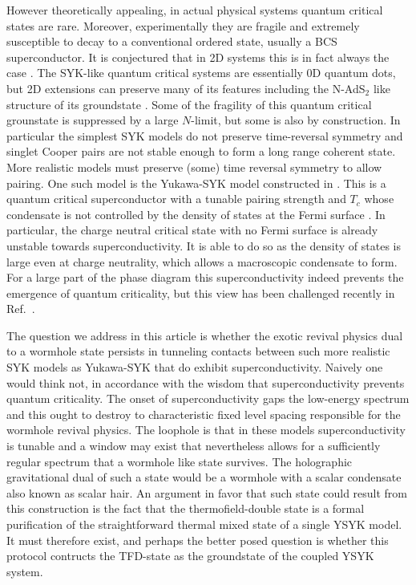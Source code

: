 However theoretically appealing, in actual physical systems quantum critical states are rare. Moreover, experimentally they are fragile and extremely susceptible to decay to a conventional ordered state, usually a BCS superconductor. It is conjectured that in 2D systems this is in fact always the case \cite{metlitskiAreNonFermiliquidsStable2015,abanov2020interplay,chubukov2020interplay}.
The SYK-like quantum critical systems are essentially 0D quantum dots, but 2D extensions can preserve many of its features including the N-AdS$_2$ like structure of its groundstate \cite{patel2023universal}. Some of the fragility of this quantum critical grounstate is suppressed by a large $N$-limit, but some is also by construction. In particular the simplest SYK models do not preserve time-reversal symmetry and singlet Cooper pairs are not stable enough to form a long range coherent state. More realistic models must preserve (some) time reversal symmetry to allow pairing. One such model is the Yukawa-SYK model constructed in \cite{esterlis2019cooper}. This is a quantum critical superconductor with a tunable pairing strength and $T_c$ whose condensate is not controlled by the density of states at the Fermi surface \cite{sheBCSSuperconductivityQuantum2010,esterlis2019cooper}. 
In particular, the charge neutral critical state with no Fermi surface is already unstable towards superconductivity. It is able to do so as the density of states is large even at charge neutrality, which allows a macroscopic condensate to form.
For a large part of the phase diagram this superconductivity indeed prevents the emergence of quantum criticality, but this view has been challenged recently in Ref.~\cite{zhang2023density}.


The question we address in this article is whether the exotic revival physics dual to a wormhole state persists in tunneling contacts between such more realistic SYK models as Yukawa-SYK that do exhibit superconductivity. Naively one would think not, in accordance with the wisdom that superconductivity prevents quantum criticality. The onset of superconductivity gaps the low-energy spectrum and this ought to destroy to characteristic fixed level spacing responsible for the wormhole revival physics. The loophole is that in these models superconductivity is tunable and a window may exist that nevertheless allows for a sufficiently regular spectrum that a wormhole like state survives. The holographic gravitational dual of such a state would be a wormhole with a scalar condensate also known as scalar hair. An argument in favor that such state could result from this construction is the fact that the thermofield-double state is a formal purification of the straightforward thermal mixed state of a single YSYK model. It must therefore exist, and perhaps the better posed question is whether this protocol contructs the TFD-state as the groundstate of the coupled YSYK system.      

